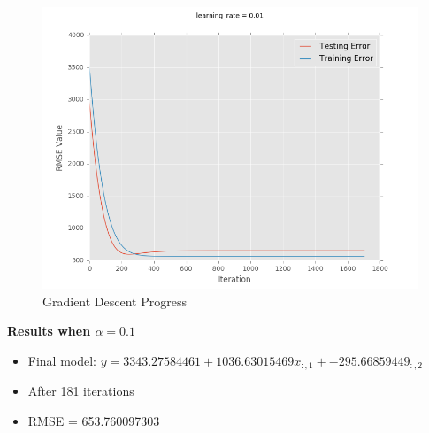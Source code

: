 \documentclass[12pt]{article}
\begin{document}
\begin{figure}[H]
\begin{center}
\includegraphics{gradient_descent_errors.png}
\caption{Gradient Descent Progress}
\label{GD}
\end{center}
\end{figure}

\textbf{Results when $\alpha=0.1$}
\begin{itemize}
\item Final model: $y = 3343.27584461 + 1036.63015469x_{:,1} + -295.66859449_{:,2}$
\item After 181 iterations
\item RMSE = 653.760097303
\end{itemize}
\end{document}
